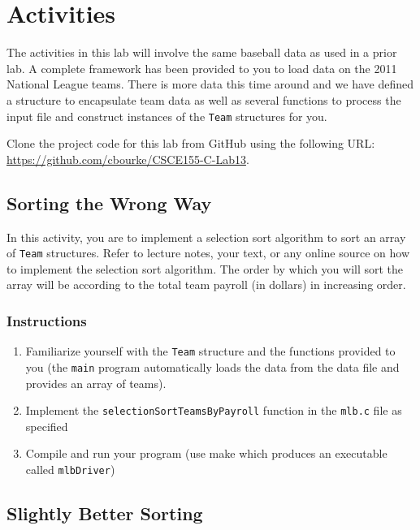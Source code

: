 \documentclass[12pt]{scrartcl}
\begin{document}
\section{Activities}

The activities in this lab will involve the same baseball data as
used in a prior lab.  A complete framework has been provided
to you to load data on the 2011 National League teams.  There
is more data this time around and we have defined a structure
to encapsulate team data as well as several functions to process
the input file and construct instances of the \texttt{Team}
structures for you.

Clone the project code for this lab from GitHub using the following
URL: \url{https://github.com/cbourke/CSCE155-C-Lab13}.

\subsection{Sorting the Wrong Way}

In this activity, you are to implement a selection sort algorithm to
sort an array of \texttt{Team} structures.  Refer to lecture notes,
your text, or any online source on how to implement the selection sort
algorithm.  The order by which you will sort the array will be according
to the total team payroll (in dollars) in increasing order.

\subsubsection*{Instructions}

\begin{enumerate}
  \item Familiarize yourself with the \texttt{Team} structure and
	the functions provided to you (the \texttt{main} program
	automatically loads the data from the data file and provides an
	array of teams).
  \item Implement the \texttt{selectionSortTeamsByPayroll}
	function in the \texttt{mlb.c} file as specified
  \item Compile and run your program (use make which produces an
	executable called \texttt{mlbDriver})
\end{enumerate}

\subsection{Slightly Better Sorting}
\end{document}
